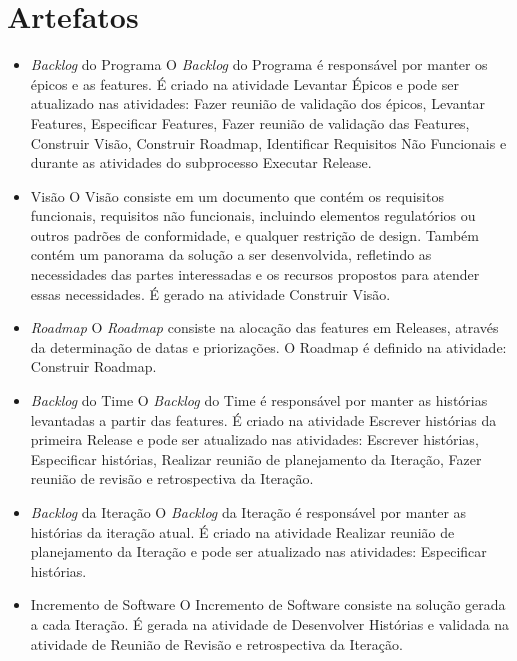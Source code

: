 \section{Artefatos}

\begin{itemize}
  \item \textit{Backlog} do Programa
    \subitem O \textit{Backlog} do Programa é responsável por manter os épicos e as features. É criado na atividade Levantar Épicos e 
    pode ser atualizado nas atividades: Fazer reunião de validação dos épicos, Levantar Features, Especificar Features, 
Fazer reunião de validação das Features, Construir Visão, Construir Roadmap, Identificar Requisitos Não Funcionais e durante as atividades
do subprocesso Executar Release.
  
  \item Visão
   \subitem O Visão consiste em um documento que contém os requisitos funcionais, requisitos não funcionais, incluindo elementos regulatórios 
   ou outros padrões de conformidade, e qualquer restrição de design. Também contém um panorama da solução a ser desenvolvida, 
   refletindo as necessidades das partes interessadas e os recursos propostos para atender essas necessidades. É gerado na atividade Construir
   Visão.
  
  \item \textit{Roadmap}
     \subitem O \textit{Roadmap} consiste na alocação das features em Releases, através da determinação de datas e priorizações. O Roadmap é 
     definido na atividade: Construir Roadmap.

    
  \item \textit{Backlog} do Time
      \subitem O \textit{Backlog} do Time é responsável por manter as histórias levantadas a partir das features. É criado na atividade Escrever 
      histórias da primeira Release e pode ser atualizado nas atividades: Escrever histórias, Especificar histórias, Realizar reunião de planejamento 
      da Iteração, Fazer reunião de revisão e retrospectiva da Iteração.
  
  \item \textit{Backlog} da Iteração
        \subitem O \textit{Backlog} da Iteração é responsável por manter as histórias da iteração atual. É criado na atividade Realizar reunião de planejamento 
      da Iteração e pode ser atualizado nas atividades: Especificar histórias.
  
  \item Incremento de Software
      \subitem O Incremento de Software consiste na solução gerada a cada Iteração. É gerada na atividade de Desenvolver Histórias e validada na 
      atividade de Reunião de Revisão e retrospectiva da Iteração.
\end{itemize}
